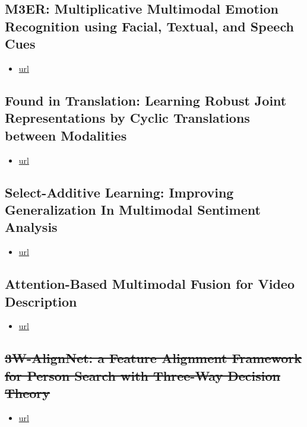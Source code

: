 \subsection{M3ER: Multiplicative Multimodal Emotion Recognition using Facial, Textual, and Speech Cues}

\begin{itemize}
\item \href{https://ojs.aaai.org/index.php/AAAI/article/view/5492}{url}
\end{itemize}

\subsection{Found in Translation: Learning Robust Joint Representations by Cyclic Translations between Modalities}

\begin{itemize}
\item \href{https://ojs.aaai.org/index.php/AAAI/article/view/4666}{url}
\end{itemize}
\subsection{Select-Additive Learning: Improving Generalization In Multimodal Sentiment Analysis}

\begin{itemize}
\item \href{https://ieeexplore.ieee.org/stamp/stamp.jsp?tp=\&arnumber=8019301}{url}
\end{itemize}

\subsection{Attention-Based Multimodal Fusion for Video Description}

\begin{itemize}
\item \href{https://openaccess.thecvf.com/content\_ICCV\_2017/papers/Hori\_Attention-Based\_Multimodal\_Fusion\_ICCV\_2017\_paper.pdf}{url}
\end{itemize}
\subsection{\st{3W-AlignNet: a Feature Alignment Framework for Person Search with Three-Way Decision Theory}}

\begin{itemize}
\item \href{https://link.springer.com/article/10.1007/s12559-021-09898-7}{url}
\end{itemize}

